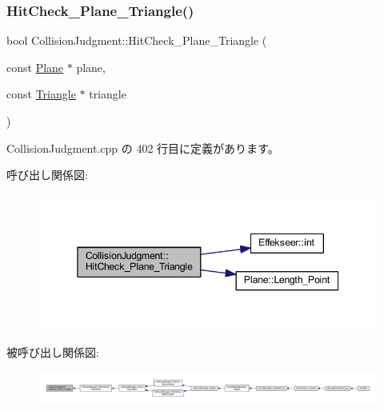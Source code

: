 \subsubsection{\texorpdfstring{Hit\+Check\+\_\+\+Plane\+\_\+\+Triangle()}{HitCheck\_Plane\_Triangle()}}
{\footnotesize\ttfamily bool Collision\+Judgment\+::\+Hit\+Check\+\_\+\+Plane\+\_\+\+Triangle (\begin{DoxyParamCaption}\item[{const \mbox{\hyperlink{class_plane}{Plane}} $\ast$}]{plane,  }\item[{const \mbox{\hyperlink{class_triangle}{Triangle}} $\ast$}]{triangle }\end{DoxyParamCaption})\hspace{0.3cm}{\ttfamily [static]}}



 Collision\+Judgment.\+cpp の 402 行目に定義があります。

呼び出し関係図\+:\nopagebreak
\begin{figure}[H]
\begin{center}
\leavevmode
\includegraphics[width=345pt]{class_collision_judgment_a473c94087dc9cd3937016ccba5f12abd_cgraph}
\end{center}
\end{figure}
被呼び出し関係図\+:
\nopagebreak
\begin{figure}[H]
\begin{center}
\leavevmode
\includegraphics[width=350pt]{class_collision_judgment_a473c94087dc9cd3937016ccba5f12abd_icgraph}
\end{center}
\end{figure}
\mbox{\label{class_collision_judgment_a612bc9e5cfcb243324417f5059c6e24d}} 

